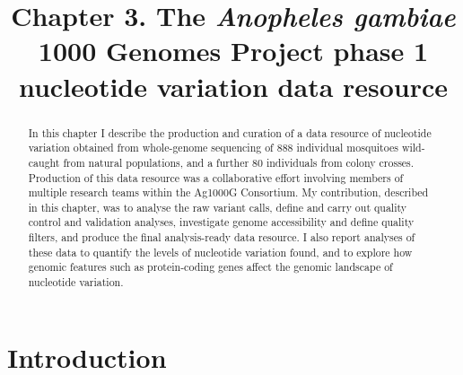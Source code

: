\documentclass[a4paper,11pt,abstracton,hidelinks]{scrartcl}
\title{
Chapter 3. The \textit{Anopheles gambiae} 1000 Genomes Project phase 1 nucleotide variation data resource
}
\author{}
\begin{document}
\renewcommand{\abstractname}{Summary}


\maketitle



\begin{abstract}


In this chapter I describe the production and curation of a data resource of nucleotide variation obtained from whole-genome sequencing of 888 individual mosquitoes wild-caught from natural populations, and a further 80 individuals from colony crosses.
%
Production of this data resource was a collaborative effort involving members of multiple research teams within the Ag1000G Consortium.
%
My contribution, described in this chapter, was to analyse the raw variant calls, define and carry out quality control and validation analyses, investigate genome accessibility and define quality filters, and produce the final analysis-ready data resource.
%
I also report analyses of these data to quantify the levels of nucleotide variation found, and to explore how genomic features such as protein-coding genes affect the genomic landscape of nucleotide variation.


\end{abstract}


\tableofcontents


\section{Introduction}\label{sec:introduction}
\end{document}
